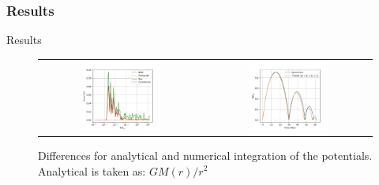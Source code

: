 \documentclass{beamer}
\begin{document}
\subsubsection{Results}
\begin{frame}{Results}
	\begin{figure}[h]
		\centering
		\begin{tabular}{cc}
			\includegraphics[width = 0.49\textwidth]{"../Files/Week 7/error"} & 
			\includegraphics[width = 0.49\textwidth]{"../Files/Week 7/symmetric_triaxial"}
		\end{tabular}
		\caption{Differences for analytical and numerical integration of the potentials. Analytical is taken as: $GM(r) / r^2$}
		\label{fig: numericalErrors}
	\end{figure}
\end{frame}
\end{document}

